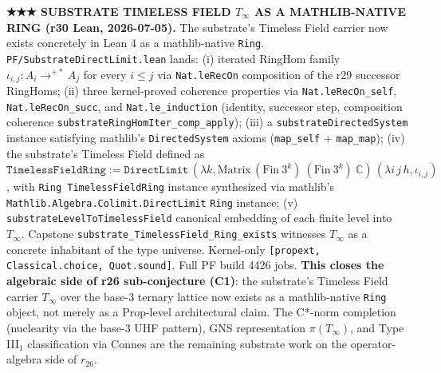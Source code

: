 \documentclass[11pt,a4paper]{amsart}
\theoremstyle{plain}
\theoremstyle{definition}
\begin{document}
\textbf{★★★ SUBSTRATE TIMELESS FIELD $T_\infty$ AS A MATHLIB-NATIVE RING (r30 Lean, 2026-07-05).} The substrate's Timeless Field carrier now exists concretely in Lean 4 as a mathlib-native \texttt{Ring}. \texttt{PF/SubstrateDirectLimit.lean} lands: (i) iterated RingHom family $\iota_{i,j} : A_i \to^{+*} A_j$ for every $i \le j$ via \texttt{Nat.leRecOn} composition of the r29 successor RingHoms; (ii) three kernel-proved coherence properties via \texttt{Nat.leRecOn\_self}, \texttt{Nat.leRecOn\_succ}, and \texttt{Nat.le\_induction} (identity, successor step, composition coherence \texttt{substrateRingHomIter\_comp\_apply}); (iii) a \texttt{substrateDirectedSystem} instance satisfying mathlib's \texttt{DirectedSystem} axioms (\texttt{map\_self} + \texttt{map\_map}); (iv) the substrate's Timeless Field defined as $\texttt{TimelessFieldRing} := \texttt{DirectLimit}\,(\lambda k, \mathrm{Matrix}\,(\mathrm{Fin}~3^k)~(\mathrm{Fin}~3^k)~\mathbb{C})\,(\lambda i\,j\,h, \iota_{i,j})$, with \texttt{Ring TimelessFieldRing} instance synthesized via mathlib's \texttt{Mathlib.Algebra.Colimit.DirectLimit} \texttt{Ring} instance; (v) \texttt{substrateLevelToTimelessField} canonical embedding of each finite level into $T_\infty$. Capstone \texttt{substrate\_TimelessField\_Ring\_exists} witnesses $T_\infty$ as a concrete inhabitant of the type universe. Kernel-only \texttt{[propext, Classical.choice, Quot.sound]}. Full PF build 4426 jobs. \textbf{This closes the algebraic side of r26 sub-conjecture (C1)}: the substrate's Timeless Field carrier $T_\infty$ over the base-3 ternary lattice now exists as a mathlib-native \texttt{Ring} object, not merely as a Prop-level architectural claim. The C*-norm completion (nuclearity via the base-3 UHF pattern), GNS representation $\pi(T_\infty)$, and Type III$_1$ classification via Connes are the remaining substrate work on the operator-algebra side of $r_{26}$.
\end{document}
